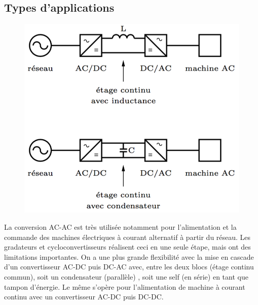 	\subsection{Types d'applications}
		\begin{figure}
		\vspace{-5mm}
		\includegraphics[scale=0.25]{ch1/4}
		\end{figure}		
		La conversion AC-AC est très utilisée notamment pour l'alimentation et la commande des machines électriques à courant alternatif à partir du réseau. Les gradateurs et cycloconvertisseurs réalisent ceci en une seule étape, mais ont des limitations importantes. On a une plus grande flexibilité avec la mise en cascade d'un convertisseur AC-DC puis DC-AC avec, entre les deux blocs (étage continu commun), soit un condensateur (parallèle) , soit une self (en série) en tant que tampon d'énergie. Le même s'opère pour l'alimentation de machine à courant continu avec un convertisseur AC-DC puis DC-DC. \\
		
